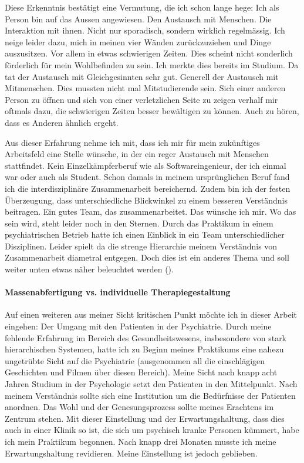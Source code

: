 Diese Erkenntnis bestätigt eine Vermutung, die ich schon lange hege: Ich als Person bin auf das Aussen angewiesen. Den Austausch mit Menschen. Die Interaktion mit ihnen. Nicht nur sporadisch, sondern wirklich regelmässig. Ich neige leider dazu, mich in meinen vier Wänden zurückzuziehen und Dinge auszusitzen. Vor allem in etwas schwierigen Zeiten. Dies scheint nicht sonderlich förderlich für mein Wohlbefinden zu sein. Ich merkte dies bereits im Studium. Da tat der Austausch mit Gleichgesinnten sehr gut. Generell der Austausch mit Mitmenschen. Dies mussten nicht mal Mitstudierende sein. Sich einer anderen Person zu öffnen und sich von einer verletzlichen Seite zu zeigen verhalf mir oftmals dazu, die schwierigen Zeiten besser bewältigen zu können. Auch zu hören, dass es Anderen ähnlich ergeht. 

Aus dieser Erfahrung nehme ich mit, dass ich mir für mein zukünftiges Arbeitsfeld eine Stelle wünsche, in der ein reger Austausch mit Menschen stattfindet. Kein Einzelkämpferberuf wie als Softwareingenieur, der ich einmal war oder auch als Student. Schon damals in meinem ursprünglichen Beruf fand ich die interdisziplinäre Zusammenarbeit bereichernd. Zudem bin ich der festen Überzeugung, dass unterschiedliche Blickwinkel zu einem besseren Verständnis beitragen. Ein gutes Team, das zusammenarbeitet. Das wünsche ich mir. Wo das sein wird, steht leider noch in den Sternen. Durch das Praktikum in einem psychiatrischen Betrieb hatte ich einen Einblick in ein Team unterschiedlicher Disziplinen. Leider spielt da die strenge Hierarchie meinem Verständnis von Zusammenarbeit diametral entgegen. Doch dies ist ein anderes Thema und soll weiter unten etwas näher beleuchtet werden ().

\paragraph{Massenabfertigung vs. individuelle Therapiegestaltung}
Auf einen weiteren aus meiner Sicht kritischen Punkt möchte ich in dieser Arbeit eingehen: Der Umgang mit den Patienten in der Psychiatrie. Durch meine fehlende Erfahrung im Bereich des Gesundheitswesens, insbesondere von stark hierarchischen Systemen, hatte ich zu Beginn meines Praktikums eine nahezu ungetrübte Sicht auf die Psychiatrie (ausgenommen all die einschlägigen Geschichten und Filmen über diesen Bereich). Meine Sicht nach knapp acht Jahren Studium in der Psychologie setzt den Patienten in den Mittelpunkt. Nach meinem Verständnis sollte sich eine Institution um die Bedürfnisse der Patienten anordnen. Das Wohl und der Genesungsprozess sollte meines Erachtens im Zentrum stehen. Mit dieser Einstellung und der Erwartungshaltung, dass dies auch in einer Klinik so ist, die sich um psychisch kranke Personen kümmert, habe ich mein Praktikum begonnen. Nach knapp drei Monaten musste ich meine Erwartungshaltung revidieren. Meine Einstellung ist jedoch geblieben. 

